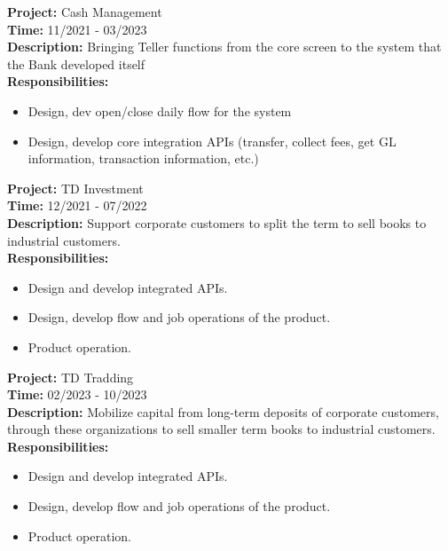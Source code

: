 \documentclass[11pt,a4paper,sans]{moderncv}
\begin{document}
\begin{mdframed}[style=ProjectFrame]
	\textbf{Project:} Cash Management \\
	\textbf{Time:} 11/2021 - 03/2023 \\
	\textbf{Description:} Bringing Teller functions from the core screen to the system that the Bank developed itself\\
	\textbf{Responsibilities:}
	\begin{itemize}[leftmargin=0.6cm,noitemsep,topsep=0pt,label=-]
	\item Design, dev open/close daily flow for the system
	\item Design, develop core integration APIs (transfer, collect fees, get GL information, transaction information, etc.)
	\end{itemize}
\end{mdframed}

\begin{mdframed}[style=ProjectFrame]
	\textbf{Project:} TD Investment \\
	\textbf{Time:} 12/2021 - 07/2022 \\
	\textbf{Description:} Support corporate customers to split the term to sell books to industrial customers.\\
	\textbf{Responsibilities:}
	\begin{itemize}[leftmargin=0.6cm,noitemsep,topsep=0pt,label=-]
		\item Design and develop integrated APIs.
		\item Design, develop flow and job operations of the product.
		\item Product operation.
	\end{itemize}
\end{mdframed}

\begin{mdframed}[style=ProjectFrame]
	\textbf{Project:} TD Tradding\\
	\textbf{Time:} 02/2023 - 10/2023 \\
	\textbf{Description:} Mobilize capital from long-term deposits of corporate customers, through these organizations to sell smaller term books to industrial customers.\\
	\textbf{Responsibilities:}
	\begin{itemize}[leftmargin=0.6cm,noitemsep,topsep=0pt,label=-]
		\item Design and develop integrated APIs.
		\item Design, develop flow and job operations of the product.
		\item Product operation.
	\end{itemize}
\end{mdframed}
\end{document}
